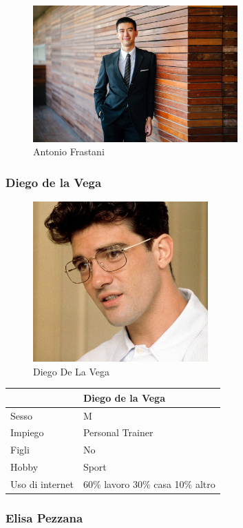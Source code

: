 \documentclass[12pt,italian,]{report}
\begin{document}
\begin{figure}[h]
\centering
\includegraphics[width=0.7\textwidth,height=\textheight]{img/antonio.jpeg}
\caption{Antonio Frastani}
\end{figure}

\hypertarget{diego-de-la-vega}{%
\subsubsection{Diego de la Vega}\label{diego-de-la-vega}}

\begin{figure}[h]
\centering
\includegraphics[width=0.6\textwidth,height=\textheight]{img/diego.jpg}
\caption{Diego De La Vega}
\end{figure}

\begin{longtable}[]{@{}ll@{}}
\toprule
& Diego de la Vega\tabularnewline
\midrule
\endhead
Sesso & M\tabularnewline
Impiego & Personal Trainer\tabularnewline
Figli & No\tabularnewline
Hobby & Sport\tabularnewline
Uso di internet & 60\% lavoro 30\% casa 10\% altro\tabularnewline
\bottomrule
\end{longtable}

\hypertarget{elisa-pezzana}{%
\subsubsection{Elisa Pezzana}\label{elisa-pezzana}}
\end{document}
